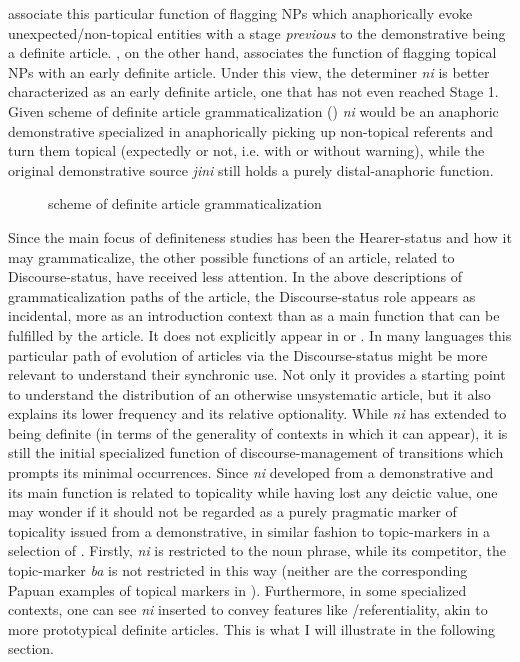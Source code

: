 \documentclass[output=paper
,modfonts
,nonflat]{langsci/langscibook}
\begin{document}
\citet{HeineKuteva2006} associate this particular function of flagging NPs which anaphorically evoke unexpected/non-topical entities with a stage \textit{previous} to the demonstrative being a definite article. \citet{Givon2001}, on the other hand, associates the function of flagging topical NPs with an early definite article. Under this view, the determiner \textit{ni} is better characterized as an early definite article, one that has not even reached  Stage 1. 
Given  scheme of definite article grammaticalization () \textit{ni} would be an anaphoric demonstrative specialized in anaphorically picking up non-topical referents and turn them topical (expectedly or not, i.e. with or without warning), while the original demonstrative source \textit{jini} still holds a purely distal-anaphoric function.

\begin{figure}[h] 
	\caption{ scheme of definite article grammaticalization\label{fig:pico:5}}
\end{figure}

Since the main focus of definiteness studies has been the Hearer-status and how it may grammaticalize, the other possible functions of an article, related to Discourse-status, have received less attention.  
In the above descriptions of grammaticalization paths of the article, the Discourse-status role appears as incidental, more as an introduction context than as a main function that can be fulfilled by the article. It does not explicitly appear in  or . In many languages this particular path of evolution of articles via the Discourse-status might be more relevant to understand their synchronic use. Not only it provides a starting point to understand the distribution of an otherwise unsystematic article, but it also explains its lower frequency and its relative optionality. 
While \textit{ni} has extended to being definite (in terms of the generality of contexts in which it can appear), it is still the initial specialized function of discourse-management of transitions which prompts its minimal occurrences. 
Since \textit{ni} developed from a demonstrative and its main function is related to topicality while having lost any deictic value, one may wonder if it should not be regarded as a purely pragmatic marker of topicality issued from a demonstrative, in similar fashion to topic-markers in a selection of  \citep{deVries1995}. 
Firstly, \textit{ni} is restricted to the noun phrase, while its competitor, the topic-marker \textit{ba} is not restricted in this way (neither are the corresponding Papuan examples of topical markers in \citealt{deVries1995}). Furthermore, in some specialized contexts, one can see \textit{ni} inserted to convey features like /referentiality, akin to more prototypical definite articles. This is what I will illustrate in the following section.
\end{document}

